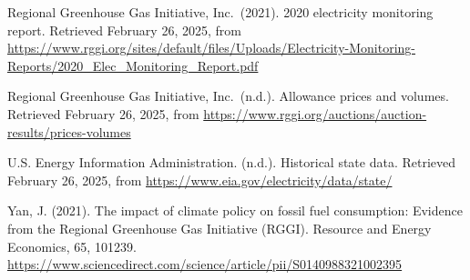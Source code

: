 \documentclass[
]{article}
\begin{document}
Regional Greenhouse Gas Initiative, Inc.~(2021). 2020 electricity
monitoring report. Retrieved February 26, 2025, from
\url{https://www.rggi.org/sites/default/files/Uploads/Electricity-Monitoring-Reports/2020_Elec_Monitoring_Report.pdf}

Regional Greenhouse Gas Initiative, Inc.~(n.d.). Allowance prices and
volumes. Retrieved February 26, 2025, from
\url{https://www.rggi.org/auctions/auction-results/prices-volumes}

U.S. Energy Information Administration. (n.d.). Historical state data.
Retrieved February 26, 2025, from
\url{https://www.eia.gov/electricity/data/state/}

Yan, J. (2021). The impact of climate policy on fossil fuel consumption:
Evidence from the Regional Greenhouse Gas Initiative (RGGI). Resource
and Energy Economics, 65, 101239.
\url{https://www.sciencedirect.com/science/article/pii/S0140988321002395}
\end{document}
